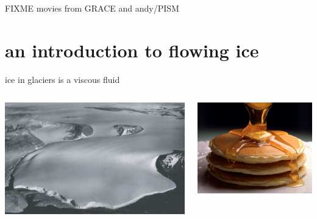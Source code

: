 \documentclass[hide notes,intlimits]{beamer}
\begin{document}


\begin{frame}{FIXME movies from GRACE and andy/PISM}
\end{frame}


\section[intro to ice flow]{an introduction to flowing ice}


\begin{frame}{ice in glaciers is a viscous fluid}
\begin{columns}
\begin{column}{0.65\textwidth}
\includegraphics[width=1.0\textwidth]{polaris}
\end{column}
\begin{column}{0.35\textwidth}
\includegraphics[width=1.0\textwidth]{pancakes}
\end{column}
\end{columns}


\end{frame}
\end{document}
